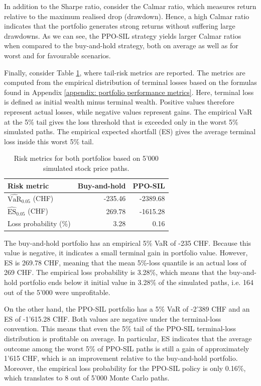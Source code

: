 In addition to the Sharpe ratio, consider the Calmar ratio, which measures return relative to the maximum realised drop (drawdown). Hence, a high Calmar ratio indicates that the portfolio generates strong returns without suffering large drawdowns. As we can see, the PPO-SIL strategy yields larger Calmar ratios when compared to the buy-and-hold strategy, both on average as well as for worst and for favourable scenarios. 

Finally, consider Table \ref{tab: risk metrics}, where tail-risk metrics are reported. The metrics are computed from the empirical distribution of terminal losses based on the formulas found in Appendix \ref{appendix: portfolio performance metrics}. Here, terminal loss is defined as initial wealth minus terminal wealth. Positive values therefore represent actual losses, while negative values represent gains. The empirical VaR at the 5\% tail gives the loss threshold that is exceeded only in the worst 5\% simulated paths. The empirical expected shortfall (ES) gives the average terminal loss inside this worst 5\% tail. 
\begin{table}[!htbp]
    \centering
    \begin{tabular}{lrr}
        \toprule
        Risk metric & Buy-and-hold & PPO-SIL \\
        \midrule
         $\widehat{\text{VaR}}_{0.05}$ (CHF) & -235.46 & -2389.68 \\
         $\widehat{\text{ES}}_{0.05}$ (CHF) & 269.78 & -1615.28 \\
         Loss probability (\%) &  3.28 & 0.16 \\
        \bottomrule
    \end{tabular}
    \caption{Risk metrics for both portfolios based on 5'000 simulated stock price paths.}
    \label{tab: risk metrics}
\end{table}
The buy-and-hold portfolio has an empirical 5\% VaR of -235 CHF. Because this value is negative, it indicates a small terminal gain in portfolio value. However, ES is 269.78 CHF, meaning that the mean 5\%-loss quantile is an actual loss of 269 CHF. The empirical loss probability is 3.28\%, which means that the buy-and-hold portfolio ends below it initial value in 3.28\% of the simulated paths, i.e. 164 out of the 5'000 were  unprofitable. 

On the other hand, the PPO-SIL portfolio has a 5\% VaR of -2'389 CHF and an ES of -1'615.28 CHF. Both values are negative under the terminal-loss convention. This means that even the 5\% tail of the PPO-SIL terminal-loss distribution is profitable on average. In particular, ES indicates that the average outcome among the worst 5\% of PPO-SIL paths is still a gain of approximately 1'615 CHF, which is an improvement relative to the buy-and-hold portfolio. Moreover, the empirical loss probability for the PPO-SIL policy is only 0.16\%, which translates to 8 out of 5'000 Monte Carlo paths. 

